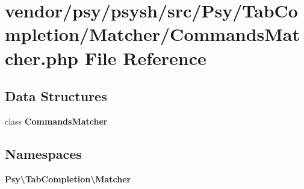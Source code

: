 \section{vendor/psy/psysh/src/\+Psy/\+Tab\+Completion/\+Matcher/\+Commands\+Matcher.php File Reference}
\label{_commands_matcher_8php}
\subsection*{Data Structures}
\begin{DoxyCompactItemize}
\item 
class {\bf Commands\+Matcher}
\end{DoxyCompactItemize}
\subsection*{Namespaces}
\begin{DoxyCompactItemize}
\item 
 {\bf Psy\textbackslash{}\+Tab\+Completion\textbackslash{}\+Matcher}
\end{DoxyCompactItemize}
